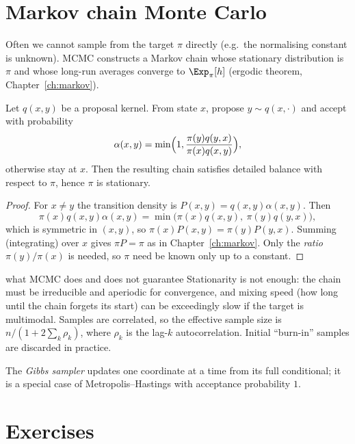 \section{Markov chain Monte Carlo}

Often we cannot sample from the target $\pi$ directly (e.g.\ the normalising constant is
unknown). MCMC constructs a Markov chain whose stationary distribution is $\pi$ and whose
long-run averages converge to $\Exp_\pi[h]$ (ergodic theorem, Chapter~\ref{ch:markov}).

\begin{theorem}\label{thm:mh}
Let $q(x,y)$ be a proposal kernel. From state $x$, propose $y\sim q(x,\cdot)$ and accept with
probability
\[
\alpha(x,y)=\min\Bigl(1,\frac{\pi(y)q(y,x)}{\pi(x)q(x,y)}\Bigr),
\]
otherwise stay at $x$. Then the resulting chain satisfies detailed balance with respect to $\pi$,
hence $\pi$ is stationary.
\end{theorem}
\begin{proof}
For $x\ne y$ the transition density is $P(x,y)=q(x,y)\alpha(x,y)$. Then
\[
\pi(x)q(x,y)\alpha(x,y)=\min\bigl(\pi(x)q(x,y),\ \pi(y)q(y,x)\bigr),
\]
which is symmetric in $(x,y)$, so $\pi(x)P(x,y)=\pi(y)P(y,x)$. Summing (integrating) over $x$ gives
$\pi P=\pi$ as in Chapter~\ref{ch:markov}. Only the \emph{ratio} $\pi(y)/\pi(x)$ is needed, so
$\pi$ need be known only up to a constant.
\end{proof}

\begin{nuance}{what MCMC does and does not guarantee}
Stationarity is not enough: the chain must be irreducible and aperiodic for convergence, and
mixing speed (how long until the chain forgets its start) can be exceedingly slow if the target
is multimodal. Samples are correlated, so the effective sample size is $n/(1+2\sum_k\rho_k)$,
where $\rho_k$ is the lag-$k$ autocorrelation. Initial ``burn-in'' samples are discarded in practice.
\end{nuance}

The \emph{Gibbs sampler} updates one coordinate at a time from its full conditional; it is a special case
of Metropolis--Hastings with acceptance probability $1$.

\section*{Exercises}

